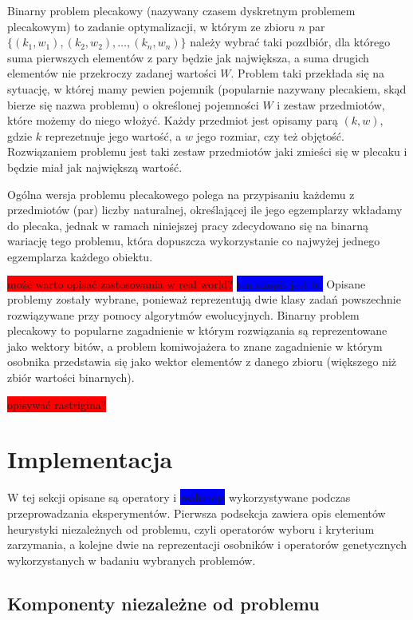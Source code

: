 \documentclass[twoside]{iisthesis}
\newcommand{\todo}{\colorbox{red}}
\newcommand{\fixme}{\colorbox{blue}}
\begin{document}
Binarny problem plecakowy (nazywany czasem dyskretnym problemem plecakowym) to zadanie optymalizacji, w którym ze zbioru $n$ par $\{ (k_1, w_1),  (k_2, w_2), \ldots, (k_n, w_n)\}$ należy wybrać taki pozdbiór, dla którego suma pierwszych elementów z pary będzie jak największa, a suma drugich elementów nie przekroczy zadanej wartości $W$.
Problem taki przekłada się na sytuację, w której mamy pewien pojemnik (popularnie nazywany plecakiem, skąd bierze się nazwa problemu) o określonej pojemności $W$ i zestaw przedmiotów, które możemy do niego włożyć. 
Każdy przedmiot jest opisamy parą $(k, w)$, gdzie $k$ reprezetnuje jego wartość, a $w$ jego rozmiar, czy też objętość. 
Rozwiązaniem problemu jest taki zestaw przedmiotów jaki zmieści się w plecaku i będzie miał jak największą wartość. 

Ogólna wersja problemu plecakowego polega na przypisaniu każdemu z przedmiotów (par) liczby naturalnej, określającej ile jego egzemplarzy wkładamy do plecaka, jednak w ramach niniejszej pracy zdecydowano się na binarną wariację tego problemu, która dopuszcza wykorzystanie co najwyżej jednego egzemplarza każdego obiektu.

\todo{może warto opisać zastosowania w real world?}
\fixme{ten akapit jest be}
Opisane problemy zostały wybrane, ponieważ reprezentują dwie klasy zadań powszechnie rozwiązywane przy pomocy algorytmów ewolucyjnych. 
Binarny problem plecakowy to popularne zagadnienie w którym rozwiązania są reprezentowane jako wektory bitów, a problem komiwojażera to znane zagadnienie w którym osobnika przedstawia się jako wektor elementów z danego zbioru (większego niż zbiór wartości binarnych). 

\todo{opisywać rastrigina?}

\section{Implementacja}

W tej sekcji opisane są operatory i \fixme{realizacje} wykorzystywane podczas przeprowadzania eksperymentów. 
Pierwsza podsekcja zawiera opis elementów heurystyki niezależnych od problemu, czyli operatorów wyboru i kryterium zarzymania, a kolejne dwie na reprezentacji osobników i operatorów genetycznych wykorzystanych w badaniu wybranych problemów.

\subsection{Komponenty niezależne od problemu}
\end{document}

